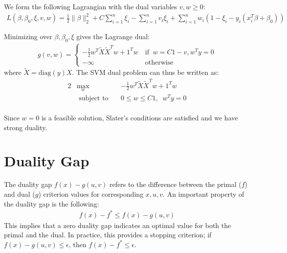 \documentclass[twoside]{article}
\begin{document}
We form the following Lagrangian with the dual variables $v,w \geq 0$:
\begin{align*}
L\left(\beta, \beta_{0}, \xi, v, w\right) = \frac{1}{2} \| \beta \|^{2}_{2} + C \sum_{i=1}^{n}\xi_{i} - \sum_{i=1}^{n}v_{i}\xi_{i} + \sum_{i=1}^{n} w_{i}\left(1 - \xi_{i} - y_{i}\left(x_{i}^{T}\beta + \beta_{0}\right) \right)
\end{align*}

Minimizing over $\beta, \beta_{0}, \xi$ gives the Lagrange dual:
\begin{align*}
g(v, w) = \begin{cases}
-\frac{1}{2} w^{T}\tilde{X}\tilde{X}^{T}w + 1^{T}w ~& \text{if}\;\; w=C1-v, w^{T}y=0 \\
-\infty ~&\text{otherwise}
\end{cases}
\end{align*}
where $\tilde{X} = \text{diag}\left(y\right)X$. The SVM dual problem can thus be written as:
\begin{alignat*}{2}
&\max_{w} && -\frac{1}{2} w^{T}\tilde{X}\tilde{X}^{T}w + 1^{T}w \\
&\text{ subject to}&~& 0 \leq w \leq C1,\;\; w^{T}y=0 \\
\end{alignat*}

Since $w=0$ is a feasible solution, Slater's conditions are satisfied and we have strong duality.

\section{Duality Gap}
The duality gap $f\left(x\right) - g\left(u,v\right)$ refers to the difference between the primal ($f$) and dual ($g$) criterion values for corresponding $x, u, v$. An important property of the duality gap is the following:
\begin{align*}
f\left(x\right) - f^{*} \leq f\left(x\right) - g\left(u,v\right)
\end{align*}
This implies that a zero duality gap indicates an optimal value for both the primal and the dual. In practice, this provides a stopping criterion; if $f\left(x\right) - g\left(u,v\right) \leq \epsilon$, then $f\left(x\right) - f^{*} \leq \epsilon$.


\end{document}
